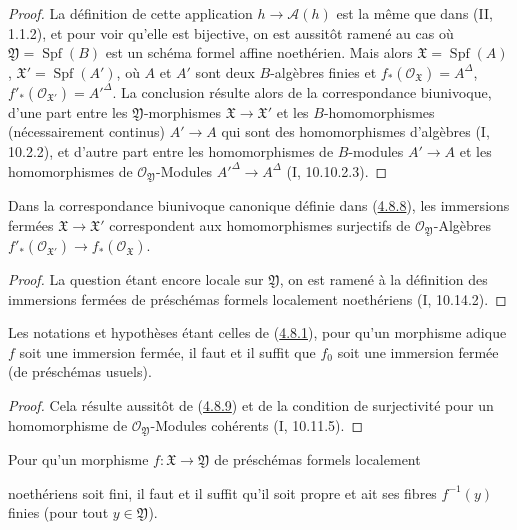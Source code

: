 \begin{proof}
La définition de cette application $h\to\mathcal A(h)$ est la même que dans
(II, 1.1.2), et pour voir qu'elle est bijective, on est aussitôt ramené au cas
où $\mathfrak Y=\operatorname{Spf}(B)$ est un schéma formel affine noethérien.
Mais alors $\mathfrak X=\operatorname{Spf}(A)$,
$\mathfrak X'=\operatorname{Spf}(A')$, où $A$ et $A'$ sont deux $B$-algèbres
finies et $f_*(\mathcal O_{\mathfrak X})=A^\Delta$,
$f'_*(\mathcal O_{\mathfrak X'})=A'^\Delta$. La conclusion résulte alors de
la correspondance biunivoque, d'une part entre les $\mathfrak Y$-morphismes
$\mathfrak X\to\mathfrak X'$ et les $B$-homomorphismes (nécessairement
continus) $A'\to A$ qui sont des homomorphismes d'algèbres (I, 10.2.2), et
d'autre part entre les homomorphismes de $B$-modules $A'\to A$ et les
homomorphismes de $\mathcal O_{\mathfrak Y}$-Modules
$A'^\Delta\to A^\Delta$ (I, 10.10.2.3).
\end{proof}

\begin{corollary}[4.8.9]
\label{III.4.8.9-fr}
Dans la correspondance biunivoque canonique définie dans
(\hyperref[III.4.8.8-fr]{4.8.8}), les immersions fermées
$\mathfrak X\to\mathfrak X'$ correspondent aux homomorphismes surjectifs de
$\mathcal O_{\mathfrak Y}$-Algèbres
$f'_*(\mathcal O_{\mathfrak X'})\to f_*(\mathcal O_{\mathfrak X})$.
\end{corollary}

\begin{proof}
La question étant encore locale sur $\mathfrak Y$, on est ramené à la
définition des immersions fermées de préschémas formels localement noethériens
(I, 10.14.2).
\end{proof}

\begin{corollary}[4.8.10]
\label{III.4.8.10-fr}
Les notations et hypothèses étant celles de
(\hyperref[III.4.8.1-fr]{4.8.1}), pour qu'un morphisme adique $f$ soit une
immersion fermée, il faut et il suffit que $f_0$ soit une immersion fermée (de
préschémas usuels).
\end{corollary}

\begin{proof}
Cela résulte aussitôt de (\hyperref[III.4.8.9-fr]{4.8.9}) et de la condition de
surjectivité pour un homomorphisme de $\mathcal O_{\mathfrak Y}$-Modules
cohérents (I, 10.11.5).
\end{proof}

\begin{proposition}[4.8.11]
\label{III.4.8.11-fr}
Pour qu'un morphisme $f:\mathfrak X\to\mathfrak Y$ de préschémas formels localement


noethériens soit fini, il faut et il suffit qu'il soit propre et ait ses fibres
$f^{-1}(y)$ finies (pour tout $y\in\mathfrak Y$).
\end{proposition}

